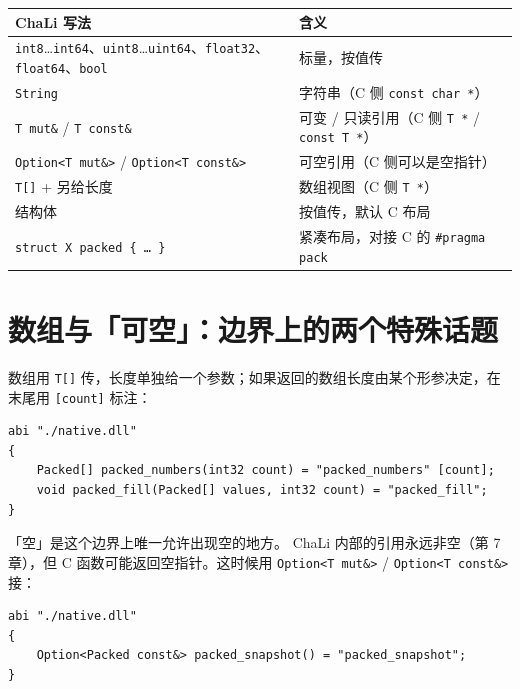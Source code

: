 {\small\setlength{\tabcolsep}{4pt}
\begin{longtable}{>{\raggedright\arraybackslash}p{}>{\raggedright\arraybackslash}p{}}
\toprule
ChaLi 写法 & 含义 \\
\midrule
\endhead
\texttt{int8}…\texttt{int64}、\texttt{uint8}…\texttt{uint64}、\texttt{float32}、\texttt{float64}、\texttt{bool} & 标量，按值传 \\
\texttt{String} & 字符串（C 侧 \texttt{const char *}） \\
\texttt{T mut\&} / \texttt{T const\&} & 可变 / 只读引用（C 侧 \texttt{T *} / \texttt{const T *}） \\
\texttt{Option<\allowbreak{}T mut\&>\allowbreak{}} / \texttt{Option<\allowbreak{}T const\&>\allowbreak{}} & 可空引用（C 侧可以是空指针） \\
\texttt{T[\allowbreak{}]\allowbreak{}} + 另给长度 & 数组视图（C 侧 \texttt{T *}） \\
结构体 & 按值传，默认 C 布局 \\
\texttt{struct X packed \{ … \}} & 紧凑布局，对接 C 的 \texttt{\#pragma pack} \\
\bottomrule
\end{longtable}
}

\section{数组与「可空」：边界上的两个特殊话题}

数组用 \texttt{T[\allowbreak{}]\allowbreak{}} 传，长度单独给一个参数；如果返回的数组长度由某个形参决定，在末尾用 \texttt{[\allowbreak{}count]\allowbreak{}} 标注：

\par
\medskip
\begin{lstlisting}[style=chali]
abi "./native.dll"
{
    Packed[] packed_numbers(int32 count) = "packed_numbers" [count];
    void packed_fill(Packed[] values, int32 count) = "packed_fill";
}
\end{lstlisting}
\par
\medskip

「空」是这个边界上唯一允许出现空的地方。 ChaLi 内部的引用永远非空（第 7 章），但 C 函数可能返回空指针。这时候用 \texttt{Option<\allowbreak{}T mut\&>\allowbreak{}} / \texttt{Option<\allowbreak{}T const\&>\allowbreak{}} 接：

\par
\medskip
\begin{lstlisting}[style=chali]
abi "./native.dll"
{
    Option<Packed const&> packed_snapshot() = "packed_snapshot";
}
\end{lstlisting}
\par
\medskip

